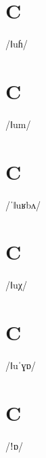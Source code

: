 \documentclass[10pt,a4paper,twoside]{book}
\begin{document}
\section*{C}

\begin{multicols}{3}
 {/ǁuɦ/} {}
\end{multicols}

\section*{C}

\begin{multicols}{3}
 {/ǁum/} {}
\end{multicols}

\section*{C}

\begin{multicols}{3}
 {/ˈǁuʁbʌ/} {}
\end{multicols}

\section*{C}

\begin{multicols}{3}
 {/ǁuχ/} {}
\end{multicols}

\section*{C}

\begin{multicols}{3}
 {/ǁuˈɣɒ/} {}
\end{multicols}

\section*{C}

\begin{multicols}{3}
 {/ǃɒ/} {}
\end{multicols}
\end{document}

